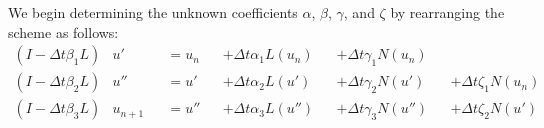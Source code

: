 \documentclass[letterpaper,11pt]{amsart}
\begin{document}
We begin determining the unknown coefficients $\alpha$, $\beta$, $\gamma$,
and $\zeta$ by rearranging the scheme as follows:
\begin{subequations}
\begin{alignat}{5}
  \left( I - \Delta{}t \beta_{1} L \right) &u'
  &&= u_{n}
  &&+ \Delta{}t \alpha_{1} L(u_{n})
  &&+ \Delta{}t \gamma_{1} N(u_{n})
\\
  \left( I - \Delta{}t \beta_{2} L \right) &u''
  &&= u'
  &&+ \Delta{}t \alpha_{2} L(u')
  &&+ \Delta{}t \gamma_{2} N(u')
  &&+ \Delta{}t \zeta_{1}  N(u_{n})
\\
  \left( I - \Delta{}t \beta_{3} L \right) &u_{n+1}
  &&= u''
  &&+ \Delta{}t \alpha_{3} L(u'')
  &&+ \Delta{}t \gamma_{3} N(u'')
  &&+ \Delta{}t \zeta_{2}  N(u')
\end{alignat}
\end{subequations}
\end{document}
